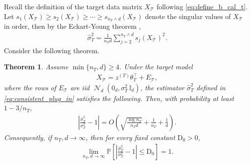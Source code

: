 \documentclass[10pt]{article}
\newtheorem{theorem}{Theorem}
\newcommand{\Pbb}{\mathbb P}
\newcommand{\Id}{\mathbb I}
\newcommand{\wh}{\widehat}
\DeclareMathOperator{\dnorm}{\mathcal N}
\newcommand{\calT}{\mathcal T}
\newcommand{\trg}{T}
\newcommand{\thetaT}{\theta_{\trg}}
\newcommand{\nT}{n_{\trg}}
\newcommand{\sigmaT}{\sigma_{\trg}}
\newcommand{\ztar}{z^{(\trg)}}
\begin{document}
Recall the definition of the target data matrix $X_\calT$ following \eqref{eq:define_b_cal_t}. Let $s_1(X_\calT)\ge s_2(X_\calT)\ge\cdots\ge s_{\nT \wedge d}(X_\calT)$ denote the singular
values of $X_\calT$ in order, then by the Eckart-Young theorem \citep{EckartYoung1936},
\begin{align}
\label{eq:eckhart_young}
\wh\sigma^2_T=\frac{1}{\nT d}\sum_{j=2}^{\nT \wedge d}s_j(X_\calT)^2 .
\end{align}
Consider the following theorem.
\begin{theorem}
\label{thm:sigmaT_hat_consistency}
Assume $\min\{\nT,d\}\ge 4$. Under the target model
\begin{align}
    X_\calT = \ztar \thetaT^\top + E_{\calT},
\end{align}
where the rows of $E_{\calT}$ are iid
$\dnorm_d(0_d,\sigmaT^2\,\Id_d)$, the estimator $\wh\sigma^2_T$ defined in
\eqref{eq:consistent_plug_in} satisfies the following. Then,
with probability at least  $1-3/\nT$,
\begin{align}
\left|\frac{\wh\sigma^2_T}{\sigmaT^2}-1\right|=O\left(\sqrt{\frac{\log \nT}{\nT d}}+\frac{1}{\nT}+\frac{1}{d}\right).
\label{eq:sigmaT_hat_rate}
\end{align}
Consequently, if $\nT,d\to\infty$, then for every fixed constant $\mathrm D_0>0$,
\begin{align}
\lim_{\nT,d \to \infty}\Pbb\left[\left|\frac{\wh\sigma^2_T}{\sigmaT^2}-1\right|\le \mathrm D_0\right]=1.
\end{align}
\end{theorem}
\end{document}
